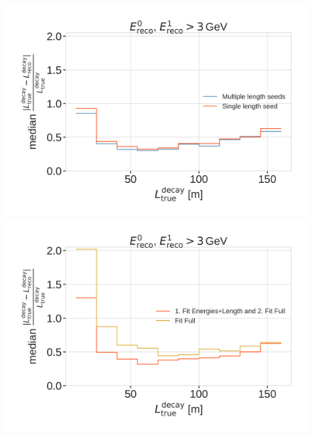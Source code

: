 \begin{figure}[h]
	\centering
    \includegraphics[width=0.49\linewidth]{figures/results/190605_reco_optimization/decay_length_seeding_median_decay_length_resolution_Good + L7 + reco E1,E2 above 3_fix_y.png}
    \includegraphics[width=0.49\linewidth]{figures/results/190605_reco_optimization/fit_routine_splitting_median_decay_length_resolution_Good + L7 + reco E1,E2 above 3_fix_y.png}
    \caption[]{}
\end{figure}

